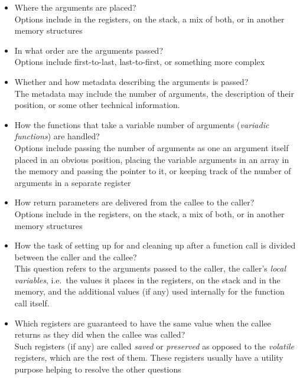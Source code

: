 \begin{itemize}
    \item Where the arguments are placed? \\
    Options include in the registers, on the stack, a mix of both,
    or in another memory structures

    \item In what order are the arguments passed? \\
    Options include first-to-last, last-to-first, or something more complex

    \item Whether and how metadata describing the arguments is passed? \\
    The metadata may include the number of arguments, the description
    of their position, or some other technical information.

    \item How the functions that take a variable number of arguments
    (\textit{variadic functions}) are handled? \\
    Options include passing the number of arguments as one an argument
    itself placed in an obvious position, placing the variable arguments
    in an array in the memory and passing the pointer to it, or keeping
    track of the number of arguments in a separate register

    \item How return parameters are delivered from the callee to the caller? \\
    Options include in the registers, on the stack, a mix of both,
    or in another memory structures

    \item How the task of setting up for and cleaning up after
    a function call is divided between the caller and the callee? \\
    This question refers to the arguments passed to the caller,
    the caller's \textit{local variables}, i.e.\ the values it places
    in the registers, on the stack and in the memory, and the additional
    values (if any) used internally for the function call itself.

    \item Which registers are guaranteed to have the same value
    when the callee returns as they did when the callee was called? \\
    Such registers (if any) are called \textit{saved} or \textit{preserved}
    as opposed to the \textit{volatile} registers, which are the rest of them.
    These registers usually have a utility purpose helping to resolve the other
    questions
\end{itemize}


